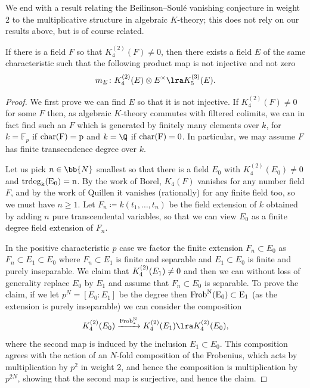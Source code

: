 \documentclass[a4paper]{amsart}
\begin{document}
We end with a result relating the Beilinson--Soul\'e vanishing conjecture in weight $2$ to the multiplicative structure in algebraic $K$-theory; this does not rely on our results above, but is of course related.

\begin{proposition}\label{prop:beilinson-soule-multiplication}
If there is a field $F$ so that $K_4^{(2)}(F) \neq 0$, then there exists a field $E$ of the same characteristic such that the following product map is not injective and not zero
\[m_E \colon K_4^{(2)}(E) \otimes E^\times \lra K_5^{(3)}(E).\]
\end{proposition}

\begin{proof}We first prove we can find $E$ so that it is not injective. If $K_4^{(2)}(F) \neq 0$ for some $F$ then, as algebraic $K$-theory commutes with filtered colimits, we can in fact find such an $F$ which is generated by finitely many elements over $k$, for $k=\mathbb{F}_p$ if $\rm{char}(F)=p$ and $k=\Q$ if $\rm{char}(F)=0$. In particular, we may assume $F$ has finite transcendence degree over $k$. 

Let us pick $n \in \bb{N}$ smallest so that there is a field $E_0$ with $K_4^{(2)}(E_0) \neq 0$ and $\rm{trdeg}_k(E_0)=n$. By the work of Borel, $K_4(F)$ vanishes for any number field $F$, and by the work of Quillen it vanishes (rationally) for any finite field too, so we must have $n \ge 1$. Let $F_n \coloneq k(t_1,\dots,t_n)$ be the field extension of $k$ obtained by adding $n$ pure transcendental variables, so that we can view $E_0$ as a finite degree field extension of $F_n$.

In the positive characteristic $p$ case we factor the finite extension $F_n \subset E_0$ as $F_n \subset E_1 \subset E_0$ where $F_n \subset E_1$ is finite and separable and $E_1 \subset E_0$ is finite and purely inseparable. We claim that $\smash{K_4^{(2)}(E_1)} \neq 0$ and then we can without loss of generality replace $E_0$ by $E_1$ and assume that $F_n \subset E_0$ is separable. To prove the claim, if we let $p^N = [E_0: E_1]$ be the degree then $\rm{Frob}^N(E_0) \subset E_1$ (as the extension is purely inseparable) we can consider the composition
\[K_4^{(2)}(E_0) \xrightarrow{\rm{Frob}^N_*} K_4^{(2)}(E_1) \lra K_4^{(2)}(E_0),\]
where the second map is induced by the inclusion $E_1 \subset E_0$. This composition agrees with the action of an $N$-fold composition of the Frobenius, which acts by multiplication by $p^2$ in weight 2, and hence the composition is multiplication by $p^{2N}$, showing that the second map is surjective, and hence the claim.  


\end{proof}
\end{document}
